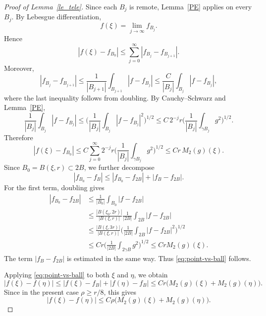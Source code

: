 \documentclass[12pt]{amsart}
\begin{document}
\begin{proof}[Proof of Lemma~\ref{le_tele}]
Since each $B_j$ is remote, Lemma~\ref{PE} applies on every $B_j$. By Lebesgue differentiation,
\[
f(\xi)=\lim_{j\to\infty} f_{B_j}.
\]
Hence
\[
|f(\xi)-f_{B_0}|
\le \sum_{j=0}^\infty |f_{B_j}-f_{B_{j+1}}|.
\]
Moreover,
\[
|f_{B_j}-f_{B_{j+1}}|
\le \frac{1}{|B_{j+1}|}\int_{B_{j+1}} |f-f_{B_j}|
\le \frac{C}{|B_{j}|}\int_{B_j}|f-f_{B_j}|,
\]
where the last inequality follows from doubling. By Cauchy--Schwarz and Lemma~\ref{PE},
\[
\frac{1}{|B_{j}|}\int_{B_j}|f-f_{B_j}|
\le
\biggl(\frac{1}{|B_{j}|}\int_{B_j}|f-f_{B_j}|^2\biggr)^{\!1/2}
\le
C\, 2^{-j}r\biggl(\frac{1}{|B_{j}|}\int_{\gamma B_j} g^2\biggr)^{\!1/2}.
\]
Therefore
\[
|f(\xi)-f_{B_0}|
\le
C\sum_{j=0}^\infty 2^{-j}r\biggl(\frac{1}{|B_{j}|}\int_{\gamma B_j} g^2\biggr)^{\!1/2}
\le
C r\, M_2(g)(\xi).
\]
Since $B_0=B(\xi,r)\subset 2B$, we further decompose
\[
|f_{B_0}-f_B| \le |f_{B_0} - f_{2B}| + |f_B - f_{2B}|.
\]
For the first term, doubling gives
\begin{align*}
    |f_{B_0} - f_{2B}|
    &\le \frac{1}{|B_0|}\int_{B_0}|f-f_{2B}|\\
    &\le \frac{|B(\xi_0,2r)|}{|B(\xi,r)|} \frac{1}{|2B|}\int_{2B} |f-f_{2B}|\\
    &\le \frac{|B(\xi,3r)|}{|B(\xi,r)|} \biggl(\frac{1}{|2B|}\int_{2B} |f-f_{2B}|^2\biggr)^{\!1/2}\\
    &\le C r \biggl(\frac{1}{|2B|}\int_{2\gamma B} g^2\biggr)^{\!1/2}
    \le C r M_2(g)(\xi).
\end{align*}
The term $|f_B - f_{2B}|$ is estimated in the same way. Thus \eqref{eq:point-vs-ball} follows.

Applying \eqref{eq:point-vs-ball} to both $\xi$ and $\eta$, we obtain
\[
|f(\xi)-f(\eta)|
\le
|f(\xi)-f_B|+|f(\eta)-f_B|
\le
C r\bigl(M_2(g)(\xi)+M_2(g)(\eta)\bigr).
\]
Since in the present case $\rho\ge r/8$, this gives
\[
|f(\xi)-f(\eta)|
\le
C \rho \bigl(M_2(g)(\xi)+M_2(g)(\eta)\bigr).
\]


\end{proof}
\end{document}
